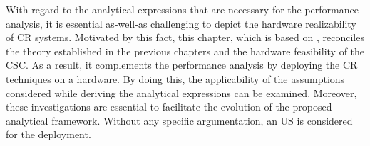 With regard to the analytical expressions that are necessary for the performance analysis, it is essential as-well-as challenging to depict the hardware realizability of CR systems. Motivated by this fact, this chapter, which is based on , reconciles the theory established in the previous chapters and the hardware feasibility of the CSC. As a result, it complements the performance analysis by deploying the CR techniques on a hardware. By doing this, the applicability of the assumptions considered while deriving the analytical expressions can be examined. Moreover, these investigations are essential to facilitate the evolution of the proposed analytical framework. Without any specific argumentation, an US is considered for the deployment.    





